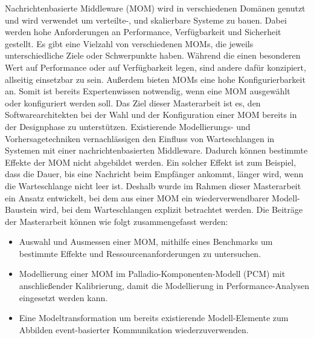 
\Abstract
Nachrichtenbasierte Middleware (MOM) wird in verschiedenen Domänen genutzt und wird verwendet um verteilte-, und skalierbare Systeme zu bauen. Dabei werden hohe Anforderungen an Performance, Verfügbarkeit und Sicherheit gestellt.
Es gibt eine Vielzahl von verschiedenen MOMs, die jeweils unterschiedliche Ziele oder Schwerpunkte haben. Während die einen besonderen Wert auf Performance oder auf Verfügbarkeit legen, sind andere dafür konzipiert, allseitig einsetzbar zu sein. Außerdem bieten MOMs eine hohe Konfigurierbarkeit an. Somit ist bereits Expertenwissen notwendig, wenn eine MOM ausgewählt oder konfiguriert werden soll. Das Ziel dieser Masterarbeit ist es, den Softwarearchitekten bei der Wahl und der Konfiguration einer MOM bereits in der Designphase zu unterstützen.
Existierende Modellierungs- und Vorhersagetechniken vernachlässigen den Einfluss von Warteschlangen in Systemen mit einer nachrichtenbasierten Middleware. Dadurch können bestimmte Effekte der MOM nicht abgebildet werden. Ein solcher Effekt ist zum Beispiel, dass die Dauer, bis eine Nachricht beim Empfänger ankommt, länger wird, wenn die Warteschlange nicht leer ist.
Deshalb wurde im Rahmen dieser Masterarbeit ein Ansatz entwickelt, bei dem aus einer MOM ein wiederverwendbarer Modell-Baustein wird, bei dem Warteschlangen explizit betrachtet werden. Die Beiträge der Masterarbeit können wie folgt zusammengefasst werden:
\begin{itemize}
    \item Auswahl und Ausmessen einer MOM, mithilfe eines Benchmarks um bestimmte Effekte und Ressourcenanforderungen zu untersuchen.
    \item Modellierung einer MOM im Palladio-Komponenten-Modell (PCM) mit anschließender Kalibrierung, damit die Modellierung in Performance-Analysen eingesetzt werden kann.
    \item Eine Modeltransformation um bereits existierende Modell-Elemente zum Abbilden event-basierter Kommunikation wiederzuverwenden.
\end{itemize}

